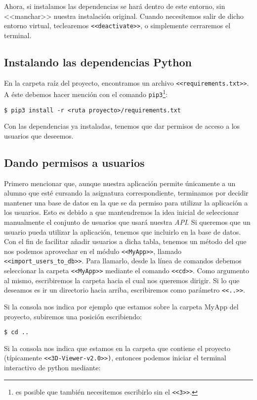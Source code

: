 Ahora, si instalamos las dependencias se hará dentro de este entorno, sin <<manchar>> nuestra instalación original. Cuando necesitemos salir de dicho entorno virtual, teclearemos \texttt{<<deactivate>>}, o simplemente cerraremos el terminal.

\subsection{Instalando las dependencias Python}\label{instalar-dependencias-python}
En la carpeta raíz del proyecto, encontramos un archivo \texttt{<<requirements.txt>>}. A éste debemos hacer mención con el comando \texttt{pip3}\footnote{es posible que también necesitemos escribirlo sin el \texttt{<<3>>}.}:

\noindent\verb|$ pip3 install -r <ruta proyecto>/requirements.txt|

Con las dependencias ya instaladas, tenemos que dar permisos de acceso a los usuarios que deseemos.

\subsection{Dando permisos a usuarios}
Primero mencionar que, aunque nuestra aplicación permite únicamente a un alumno que esté cursando la asignatura correspondiente, terminamos por decidir mantener una base de datos en la que se da permiso para utilizar la aplicación a los usuarios. Esto es debido a que mantendremos la idea inicial de seleccionar manualmente el conjunto de usuarios que usará nuestra \textit{API}. Si queremos que un usuario pueda utilizar la aplicación, tenemos que incluirlo en la base de datos. Con el fin de facilitar añadir usuarios a dicha tabla, tenemos un método del que nos podemos aprovechar en el módulo \texttt{<<MyApp>>}, llamado \texttt{<<import\_users\_to\_db>>}. Para llamarlo, desde la línea de comandos debemos seleccionar la carpeta \texttt{<<MyApp>>} mediante el comando \texttt{<<cd>>}. Como argumento al mismo, escribiremos la carpeta hacia el cual nos queremos dirigir. Si lo que deseamos es ir un directorio hacia arriba, escribiremos como parámetro \texttt{<<..>>}.

Si la consola nos indica por ejemplo que estamos sobre la carpeta MyApp del proyecto, subiremos una posición escribiendo:

\noindent\verb|$ cd ..|

Si la consola nos indica que estamos en la carpeta que contiene el proyecto (típicamente \texttt{<<3D-Viewer-v2.0>>)}, entonces podemos iniciar el terminal interactivo de python mediante:

